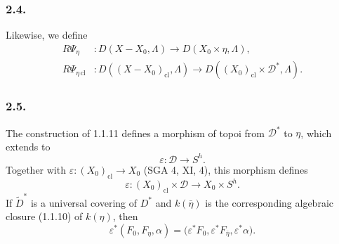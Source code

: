\subsubsection*{2.4.}
Likewise, we define
\[
\begin{aligned}
R\Psi_\eta &:D(X-X_0,\Lambda)
  \longrightarrow D(X_0\times\eta,\Lambda),\\
R\Psi_{\eta\,\mathrm{cl}} &:D((X-X_0)_{\mathrm{cl}},\Lambda)
  \longrightarrow D((X_0)_{\mathrm{cl}}\times\mathcal D^*,\Lambda).
\end{aligned}
\]

\subsubsection*{2.5.}
The construction of 1.1.11 defines a morphism of topoi from
$\mathcal D^*$ to $\eta$, which extends to
\[
\varepsilon:\mathcal D\longrightarrow S^h.
\]
Together with
$\varepsilon:(X_0)_{\mathrm{cl}}\longrightarrow X_0$ (SGA 4, XI,
4), this morphism defines
\[
\varepsilon:(X_0)_{\mathrm{cl}}\times\mathcal D
\longrightarrow X_0\times S^h.
\]
If $\widetilde D^*$ is a universal covering of $D^*$ and
$k(\bar\eta)$ is the corresponding algebraic closure (1.1.10) of
$k(\eta)$, then
\[
\varepsilon^*(F_0,F_\eta,\alpha)
=\bigl(\varepsilon^*F_0,\varepsilon^*F_{\bar\eta},
\varepsilon^*\alpha\bigr).
\]

